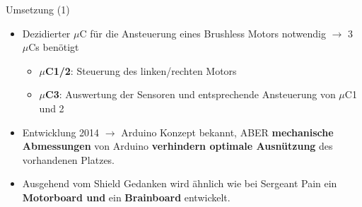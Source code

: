 \documentclass{beamer}
\begin{document}
\begin{frame}{Umsetzung (1)}
\begin{itemize}
	\item Dezidierter $\mu$C f\"ur die Ansteuerung eines Brushless Motors notwendig $\rightarrow$ 3 $\mu$Cs ben\"otigt
	\begin{itemize}
		\item \textbf{$\mu$C1/2}: Steuerung des linken/rechten Motors
		\item \textbf{$\mu$C3}: Auswertung der Sensoren und entsprechende Ansteuerung von $\mu$C1 und 2
	\end{itemize}
\end{itemize}
\begin{itemize}
	\item Entwicklung 2014 $\rightarrow$ Arduino Konzept bekannt, ABER \textbf{mechanische Abmessungen} von Arduino \textbf{verhindern optimale Ausn\"utzung} des vorhandenen Platzes.
\end{itemize}
\begin{itemize}
	\item Ausgehend vom Shield Gedanken wird \"ahnlich wie bei Sergeant Pain ein \textbf{Motorboard und} ein \textbf{Brainboard} entwickelt.
\end{itemize}
\end{frame}
\end{document}

